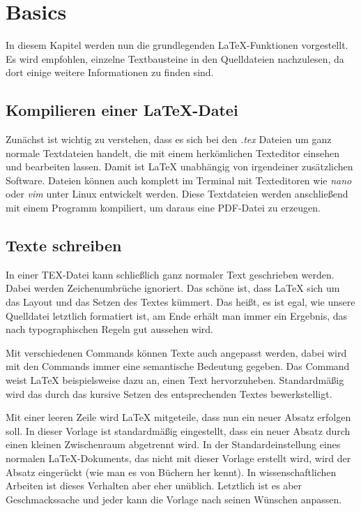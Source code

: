 
\chapter{Basics}

In diesem Kapitel werden nun die grundlegenden \LaTeX{}-Funktionen vorgestellt.
Es wird empfohlen, einzelne Textbausteine in den Quelldateien nachzulesen, da
dort einige weitere Informationen zu finden sind.

\section{Kompilieren einer \LaTeX{}-Datei}

Zunächst ist wichtig zu verstehen, dass es sich bei den \emph{.tex} Dateien um
ganz normale Textdateien handelt, die mit einem herkömlichen Texteditor
einsehen und bearbeiten lassen. Damit ist \LaTeX{} unabhängig von irgendeiner
zusätzlichen Software. Dateien können auch komplett im Terminal mit Texteditoren
wie \emph{nano} oder \emph{vim} unter Linux entwickelt werden.
Diese Textdateien werden anschließend mit einem Programm kompiliert, um daraus
eine PDF-Datei zu erzeugen.

\section{Texte schreiben}

In einer TEX-Datei kann schließlich ganz normaler Text geschrieben werden. Dabei
werden Zeichenumbrüche ignoriert. Das schöne ist, dass \LaTeX{} sich um das
Layout und das Setzen des Textes kümmert. Das heißt, es ist egal, wie unsere
Quelldatei letztlich formatiert ist, am Ende erhält man immer ein Ergebnis, das
nach typographischen Regeln gut aussehen wird.

Mit verschiedenen Commands können Texte auch angepasst werden, dabei wird
mit den Commands immer eine semantische Bedeutung gegeben. Das Command
 weist \LaTeX{} beispielsweise dazu an, einen Text
hervorzuheben. Standardmäßig wird das durch das kursive Setzen des
entsprechenden Textes bewerkstelligt.

Mit einer leeren Zeile wird \LaTeX{} mitgeteile, dass nun ein neuer Absatz
erfolgen soll. In dieser Vorlage ist standardmäßig eingestellt, dass ein neuer
Absatz durch einen kleinen Zwischenraum abgetrennt wird. In der
Standardeinstellung eines normalen \LaTeX{}-Dokuments, das nicht mit dieser
Vorlage erstellt wird, wird der Absatz eingerückt (wie man es von Büchern her
kennt). In wissenschaftlichen Arbeiten ist dieses Verhalten aber eher unüblich.
Letztlich ist es aber Geschmackssache und jeder kann die Vorlage nach seinen
Wünschen anpassen.


